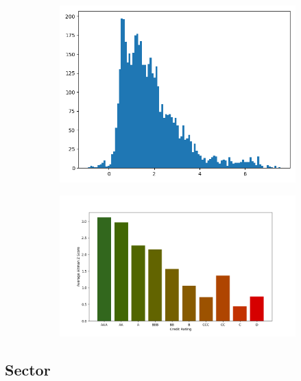 \documentclass{article}[11pt]
\begin{document}
    \begin{figure}
        \caption{Altman Z-Score}
        \begin{subfigure}[h]{0.4925\textwidth}
            \centering
            \includegraphics[width=0.95\hsize]{../Output/All Data EDA/Tabular EDA/altman_z_score_all_data_no_title.png}
        \end{subfigure}
        \begin{subfigure}[h]{0.4925\textwidth}
            \centering
            \includegraphics[width=0.95\hsize]{../Output/All Data EDA/Tabular EDA/mean_altman_Z_by_credit_rating_no_title.png}
        \end{subfigure}
        \hfill
        \label{fig:altman-z-score}
    \end{figure}
      

    \subsection*{Sector}
\end{document}
